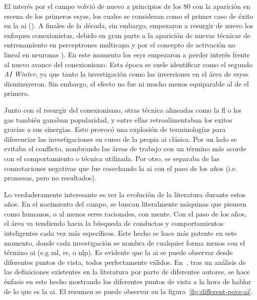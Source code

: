 El interés por el campo volvió de nuevo a principios de los $80$ con la aparición en escena de los primeros \glspl{esys}, los cuales se consideran como el primer caso de éxito en la \gls{ai} (\cite{russell2003artificial}). A finales de la década, sin embargo, empezaron a resurgir de nuevo los enfoques conexionistas, debido en gran parte a la aparición de nuevas técnicas de entrenamiento en perceptrones multicapa y por el concepto de activación no lineal en neuronas \cite{rumelhart1985learning, cybenko1989approximation}). En este momento los \acl{esys} empezaron a perder interés frente al nuevo avance del conexionismo. Esta época se suele identificar como el segundo \textit{AI Winter}, ya que tanto la investigación como las inversiones en el área de \acp{esys} disminuyeron. Sin embargo, el efecto no fue ni mucho menos equiparable al de el primero.

Junto con el resurgir del conexionismo, otras técnica alineadas como la \gls{fl} o los \glspl{ga} también ganaban popularidad, y entre ellas retroalimentaban los exitos gracias a sus sinergias. Esto provocó una explosión de terminologías para diferenciar las investigaciones en curso de la propia \gls{ai} clásica. Por un lado se evitaba el conflicto, nombrando las áreas de trabajo con un término más acorde con el comportamiento o técnica utilizada. Por otro, se separaba de las connotaciones negativas que fue cosechando la \gls{ai} con el paso de los años (i.e. promesas, pero no resultados).

Lo verdaderamente interesante es ver la evolución de la literatura durante estos años. En el nacimiento del campo, se buscan literalmente máquinas que piensen como humanos, o al menos seres racionales, con mente. Con el paso de los años, el área va tendiendo hacia la búsqueda de conductas y comportamientos inteligentes cada vez más específicos. Este hecho se hace más patente en este momento, donde cada investigación se nombra de cualquier forma menos con el término \gls{ai} (e.g \gls{ml}, \gls{rs}, o \gls{nlp}). Es evidente que la \gls{ai} se puede observar desde diferentes puntos de vista, todos perfectamente válidos. En~\cite{russell2003artificial}, tras un análisis de las definiciones existentes en la literatura por parte de diferentes autores, se hace énfasis en este hecho mostrando los diferentes puntos de vista a la hora de hablar de lo que es la \gls{ai}. El resumen se puede observar en la figura~\ref{fig:different-povs-ai}.

